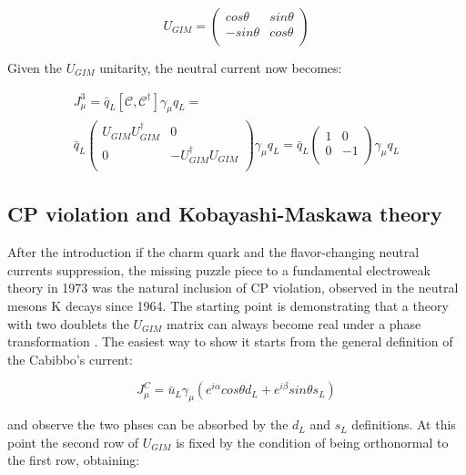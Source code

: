 \begin{equation}
U_{GIM} =
\begin{pmatrix}
cos\theta &sin\theta \\
-sin\theta &cos\theta \\
\end{pmatrix}
\end{equation}

Given the $U_{GIM}$ unitarity, the neutral current now becomes:

\begin{equation}
	\begin{aligned}
		J^{3}_{\mu} = \bar{q}_{L}\left[\mathcal{C}, \mathcal{C}^{\dagger} \right]\gamma_{\mu}q_{L} = \\
		\bar{q}_{L}
		\begin{pmatrix}
			U_{GIM}U_{GIM}^{\dagger} &0 \\
			0 &-U_{GIM}^{\dagger}U_{GIM} \\
		\end{pmatrix}
		\gamma_{\mu}q_{L} = \bar{q}_{L}
		\begin{pmatrix}
			1 &0 \\
			0 &-1 \\
		\end{pmatrix}
		\gamma_{\mu}q_{L}
	\end{aligned}
\end{equation}

\subsection{CP violation and Kobayashi-Maskawa theory}

After the introduction if the charm quark and the flavor-changing neutral currents suppression, the missing puzzle piece to a fundamental electroweak theory in 1973 was the natural inclusion of CP violation, observed in the neutral mesons K decays since 1964. 
The starting point is demonstrating that a theory with two doublets the $U_{GIM}$ matrix can always become real under a phase transformation \cite{Glashow:1970gm}. The easiest way to show it starts from the general definition of the Cabibbo's current:

\begin{equation}
J^{C}_{\mu} = \bar{u}_{L}\gamma_{\mu}\left( e^{i\alpha} cos\theta d_{L} + e^{i\beta} sin\theta s_{L}   \right)
\end{equation}

and observe the two phses can be absorbed by the $d_{L}$ and $s_{L}$ definitions. At this point the second row of $U_{GIM}$ is fixed by the condition of being orthonormal to the first row, obtaining:

